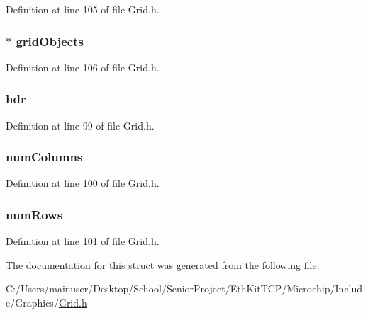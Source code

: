 Definition at line 105 of file Grid.\+h.

\hypertarget{struct_g_r_i_d_a7b8deccfe6c558ed0b221c77eabea9b9}{}
\subsubsection[{grid\+Objects}]{$\ast$ grid\+Objects}\label{struct_g_r_i_d_a7b8deccfe6c558ed0b221c77eabea9b9}


Definition at line 106 of file Grid.\+h.

\hypertarget{struct_g_r_i_d_abeffaf353197a8a64fba6707b68ce0be}{}
\subsubsection[{hdr}]{ hdr}\label{struct_g_r_i_d_abeffaf353197a8a64fba6707b68ce0be}


Definition at line 99 of file Grid.\+h.

\hypertarget{struct_g_r_i_d_a1a3eca7f6e09ee471fac874b06f59d00}{}
\subsubsection[{num\+Columns}]{ num\+Columns}\label{struct_g_r_i_d_a1a3eca7f6e09ee471fac874b06f59d00}


Definition at line 100 of file Grid.\+h.

\hypertarget{struct_g_r_i_d_a625bf09095ef5e9bfd30620c676463b6}{}
\subsubsection[{num\+Rows}]{ num\+Rows}\label{struct_g_r_i_d_a625bf09095ef5e9bfd30620c676463b6}


Definition at line 101 of file Grid.\+h.



The documentation for this struct was generated from the following file\+:\begin{DoxyCompactItemize}
\item 
C\+:/\+Users/mainuser/\+Desktop/\+School/\+Senior\+Project/\+Eth\+Kit\+T\+C\+P/\+Microchip/\+Include/\+Graphics/\hyperlink{_grid_8h}{Grid.\+h}\end{DoxyCompactItemize}
